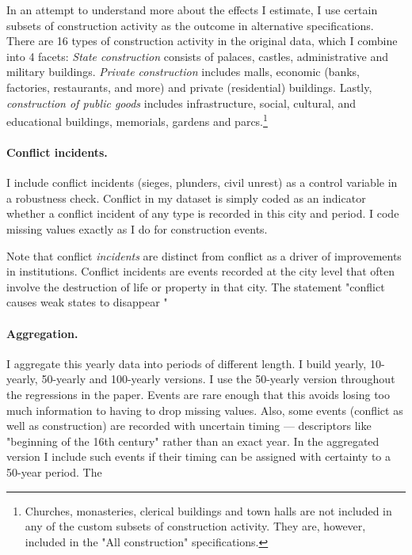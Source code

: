 \documentclass[11pt, a4paper]{article}
\begin{document}
In an attempt to understand more about the effects I estimate, I use certain subsets of construction activity as the outcome in alternative specifications. There are 16 types of construction activity in the original data, which I combine into 4 facets: \textit{State construction} consists of palaces, castles, administrative and military buildings. \textit{Private construction} includes malls, economic (banks, factories, restaurants, and more) and private (residential) buildings. Lastly, \textit{construction of public goods} includes infrastructure, social, cultural, and educational buildings, memorials, gardens and parcs.\footnote
{
Churches, monasteries, clerical buildings and town halls are not included in any of the custom subsets of construction activity. They are, however, included in the "All construction" specifications.
}


\paragraph{Conflict incidents.}

I include conflict incidents (sieges, plunders, civil unrest) as a control variable in a robustness check. Conflict in my dataset is simply coded as an indicator whether a conflict incident of any type is recorded in this city and period. I code missing values exactly as I do for construction events.

Note that conflict \textit{incidents} are distinct from conflict as a driver of improvements in institutions. Conflict incidents are events recorded at the city level that often involve the destruction of life or property in that city. The statement "conflict causes weak states to disappear "

\paragraph{Aggregation.}

I aggregate this yearly data into periods of different length. I build yearly, 10-yearly, 50-yearly and 100-yearly versions. I use the 50-yearly version throughout the regressions in the paper. Events are rare enough that this avoids losing too much information to having to drop missing values. Also, some events (conflict as well as construction) are recorded with uncertain timing --- descriptors like "beginning of the 16th century" rather than an exact year. In the aggregated version I include such events if their timing can be assigned with certainty to a 50-year period. The 
\end{document}
